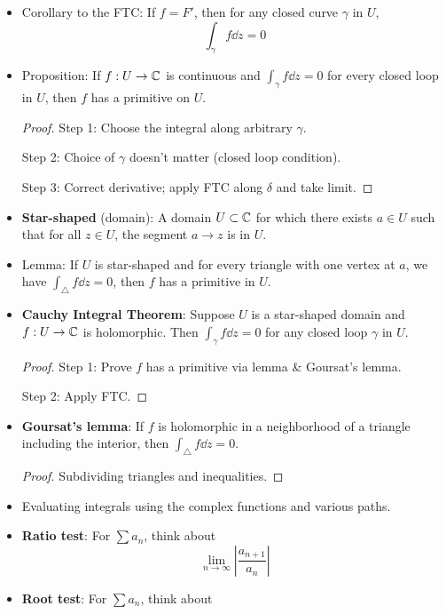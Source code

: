 \documentclass[../notes.tex]{subfiles}
\begin{document}
\begin{itemize}
    \item Corollary to the FTC: If $f=F'$, then for any closed curve $\gamma$ in $U$,
    \begin{equation*}
        \int_\gamma f\dd{z} = 0
    \end{equation*}
    \item Proposition: If $f:U\to\mathbb{C}$ is continuous and $\int_\gamma f\dd{z}=0$ for every closed loop in $U$, then $f$ has a primitive on $U$.
    \begin{proof}
        Step 1: Choose the integral along arbitrary $\gamma$.\par
        Step 2: Choice of $\gamma$ doesn't matter (closed loop condition).\par
        Step 3: Correct derivative; apply FTC along $\delta$ and take limit.
    \end{proof}
    \item \textbf{Star-shaped} (domain): A domain $U\subset\mathbb{C}$ for which there exists $a\in U$ such that for all $z\in U$, the segment $a\to z$ is in $U$.
    \item Lemma: If $U$ is star-shaped and for every triangle with one vertex at $a$, we have $\int_\triangle f\dd{z}=0$, then $f$ has a primitive in $U$.
    \item \textbf{Cauchy Integral Theorem}: Suppose $U$ is a star-shaped domain and $f:U\to\mathbb{C}$ is holomorphic. Then $\int_\gamma f\dd{z}=0$ for any closed loop $\gamma$ in $U$.
    \begin{proof}
        Step 1: Prove $f$ has a primitive via lemma \& Goursat's lemma.\par
        Step 2: Apply FTC.
    \end{proof}
    \item \textbf{Goursat's lemma}: If $f$ is holomorphic in a neighborhood of a triangle including the interior, then $\int_\triangle f\dd{z}=0$.
    \begin{proof}
        Subdividing triangles and inequalities.
    \end{proof}
    \item Evaluating integrals using the complex functions and various paths.
    \item \textbf{Ratio test}: For $\sum a_n$, think about
    \begin{equation*}
        \lim_{n\to\infty}\left| \frac{a_{n+1}}{a_n} \right|
    \end{equation*}
    \item \textbf{Root test}: For $\sum a_n$, think about
    \begin{equation*}

\end{equation*}
\end{itemize}
\end{document}
